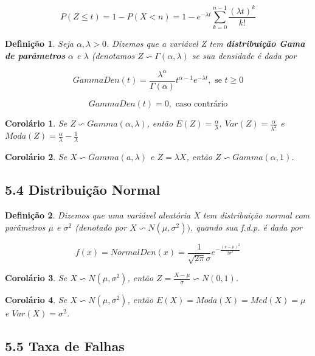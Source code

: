 \documentclass[12pt]{article}
\newtheorem{corollary}{Corolário}[theorem]
\newtheorem{definition}{Definição}
\begin{document}
$$P(Z \leq t) = 1 - P(X < n) = 1 - e^{- \lambda t} \sum_{k = 0}^{n-1} \frac{(\lambda t)^k}{k !}$$

\begin{definition}
    Seja $\alpha, \lambda > 0$. Dizemos que a variável Z tem \textbf{distribuição Gama de parâmetros} $\alpha$ e $\lambda$ (denotamos $Z \backsim \Gamma(\alpha, \lambda)$ se sua densidade é dada por
    
    $$GammaDen (t) = \frac{\lambda^\alpha}{\Gamma(\alpha)} t^{\alpha - 1}e^{- \lambda t}, \text{ se } t \geq 0$$
    
    $$GammaDen (t) = 0, \text{ caso contrário}$$
\end{definition}

\begin{corollary}
    Se $Z \backsim Gamma(\alpha, \lambda)$, então $E(Z) = \frac{\alpha}{\lambda}, \ Var(Z) = \frac{\alpha}{\lambda^2}$ e $Moda(Z) = \frac{\alpha}{\lambda} - \frac{1}{\lambda}$
\end{corollary}

\begin{corollary}
    Se $X \backsim Gamma(a, \lambda)$ e $Z = \lambda X$, então $Z \backsim Gamma(\alpha, 1)$.
\end{corollary}

\subsection*{5.4 Distribuição Normal}
\label{s24}

\begin{definition}
    Dizemos que uma variável aleatória X tem distribuição normal com parâmetros $\mu$ e $\sigma^2$ (denotado por $X \backsim N(\mu, \sigma^2))$, quando sua f.d.p. é dada por 

    $$f(x) = NormalDen(x) = \frac{1}{\sqrt{2 \pi} \sigma} e^{- \frac{(x - \mu)^2}{2 \sigma^2}}$$
\end{definition}

\begin{corollary}
    Se $X \backsim N(\mu, \sigma^2)$, então $Z = \frac{X - \mu}{\sigma} \backsim N(0, 1)$.
\end{corollary}

\begin{corollary}
    Se $X \backsim N(\mu, \sigma^2)$, então $E(X) = Moda(X) = Med(X) = \mu$ e $Var(X) = \sigma^2$.
\end{corollary}

\subsection*{5.5 Taxa de Falhas}
\label{s25}
\end{document}
